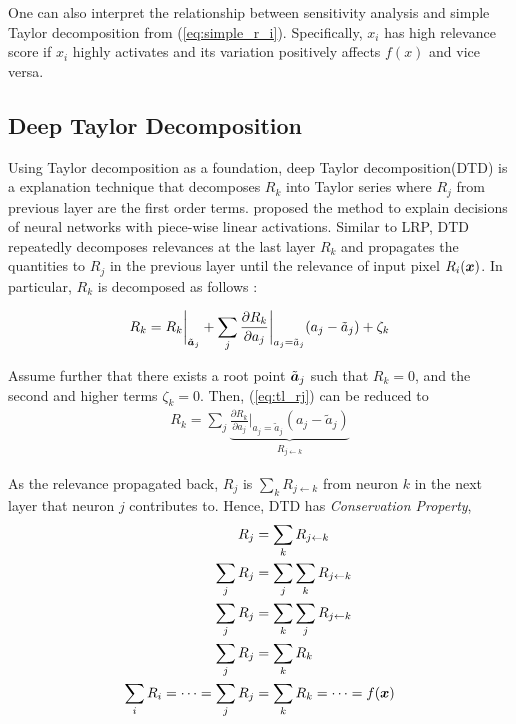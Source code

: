 One can also interpret the relationship between sensitivity analysis and simple Taylor decomposition from (\ref{eq:simple_r_i}). Specifically, $x_i$ has high relevance score if $x_i$ highly activates and its variation positively affects $f(x)$ and vice versa.



\subsection{Deep Taylor Decomposition}
Using Taylor decomposition as a foundation, deep Taylor decomposition(DTD) is a explanation technique that decomposes $R_k$ into Taylor series where $R_j$ from previous layer are the first order terms. \cite{MontavonExplainingnonlinearclassification2017} proposed the method to explain decisions of neural networks with piece-wise linear activations. Similar to LRP, DTD repeatedly decomposes relevances at the last layer $R_k$ and propagates the quantities to $R_j$ in the previous layer until the relevance of input pixel $R_i(\boldsymbol{x})$. In particular, $R_k$ is decomposed as follows :




 \begin{align} \label{eq:tl_rj}
 R_k = R_k \bigg|_{ \tilde{\patvector{a}}_j } + \sum_{ j } 	\frac{\partial  R_k }{ \partial a_j } \bigg|_{ a_j = \tilde{a}_j } ( a_j - \tilde{a}_j ) + \zeta_k
 \end{align}

Assume further that there exists a root point $\tilde{\patvector{a}}_j$ such that $R_k = 0$, and the second and higher terms $\zeta_k = 0 $. Then, (\ref{eq:tl_rj}) can be reduced to
\begin{align} \label{eq:R_k_sum}
 R_k = \sum_{ j } \underbrace{	\frac{\partial  R_k }{ \partial a_j } \bigg|_{ a_j = \tilde{a}_j }  ( a_j - \tilde{a}_j ) }_{ R_{j \leftarrow k } }
\end{align}

As the relevance propagated back,  $R_j$ is $\sum_{k} R_{j\leftarrow k}$ from neuron $k$ in the next layer that neuron $j$ contributes to. Hence, DTD has \textit{Conservation Property}, 
\begin{align} 
	R_j &= \sum_{k} R_{j\leftarrow k} \label{eq:rj_from_rk} \\
\sum_{j}	R_j &= \sum_{j} \sum_{k} R_{j\leftarrow k}\\
\sum_{j}	R_j &= \sum_{k} \sum_{j} R_{j\leftarrow k} \\
\sum_{j}	R_j &= \sum_{k}  R_{k} \\
\sum_i 	R_{i} = 	\dots = \sum_j R_{j} &= \sum_k R_{k} = \dots =  f(\patvector{x}) \label{eq:rj_equal_rk}
\end{align}

